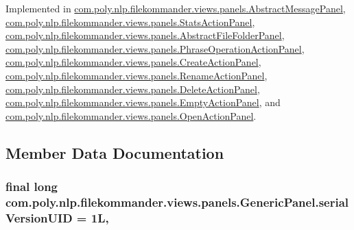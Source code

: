 Implemented in \hyperlink{classcom_1_1poly_1_1nlp_1_1filekommander_1_1views_1_1panels_1_1_abstract_message_panel_a305ad7e0b41448b92cfc567062fbb874}{com.\-poly.\-nlp.\-filekommander.\-views.\-panels.\-Abstract\-Message\-Panel}, \hyperlink{classcom_1_1poly_1_1nlp_1_1filekommander_1_1views_1_1panels_1_1_stats_action_panel_a2c9b149207152e5d1570c62172fd8823}{com.\-poly.\-nlp.\-filekommander.\-views.\-panels.\-Stats\-Action\-Panel}, \hyperlink{classcom_1_1poly_1_1nlp_1_1filekommander_1_1views_1_1panels_1_1_abstract_file_folder_panel_a2308ee0dc3eaea5b8b525fd02f60e000}{com.\-poly.\-nlp.\-filekommander.\-views.\-panels.\-Abstract\-File\-Folder\-Panel}, \hyperlink{classcom_1_1poly_1_1nlp_1_1filekommander_1_1views_1_1panels_1_1_phrase_operation_action_panel_a602dc045881eb866cc9bebbb5b925a00}{com.\-poly.\-nlp.\-filekommander.\-views.\-panels.\-Phrase\-Operation\-Action\-Panel}, \hyperlink{classcom_1_1poly_1_1nlp_1_1filekommander_1_1views_1_1panels_1_1_create_action_panel_a94e3d36d8b58ed6cabfc7f4e62ca7f4d}{com.\-poly.\-nlp.\-filekommander.\-views.\-panels.\-Create\-Action\-Panel}, \hyperlink{classcom_1_1poly_1_1nlp_1_1filekommander_1_1views_1_1panels_1_1_rename_action_panel_a9defdeb4b3f825b7bd34081700b92e10}{com.\-poly.\-nlp.\-filekommander.\-views.\-panels.\-Rename\-Action\-Panel}, \hyperlink{classcom_1_1poly_1_1nlp_1_1filekommander_1_1views_1_1panels_1_1_delete_action_panel_a8334eff673455509d9432646a4c49799}{com.\-poly.\-nlp.\-filekommander.\-views.\-panels.\-Delete\-Action\-Panel}, \hyperlink{classcom_1_1poly_1_1nlp_1_1filekommander_1_1views_1_1panels_1_1_empty_action_panel_a3e1704fd567bd8b67851f6068035aad3}{com.\-poly.\-nlp.\-filekommander.\-views.\-panels.\-Empty\-Action\-Panel}, and \hyperlink{classcom_1_1poly_1_1nlp_1_1filekommander_1_1views_1_1panels_1_1_open_action_panel_aa37ab18925690ab2ed3ba3f1071126b2}{com.\-poly.\-nlp.\-filekommander.\-views.\-panels.\-Open\-Action\-Panel}.



\subsection{Member Data Documentation}
\hypertarget{classcom_1_1poly_1_1nlp_1_1filekommander_1_1views_1_1panels_1_1_generic_panel_ac3f7f05bbdfeb29c6d8dd1eebfbda726}{
\subsubsection[{serial\-Version\-U\-I\-D}]{\setlength{\rightskip}{0pt plus 5cm}final long com.\-poly.\-nlp.\-filekommander.\-views.\-panels.\-Generic\-Panel.\-serial\-Version\-U\-I\-D = 1\-L\hspace{0.3cm}{\ttfamily [static]}, {\ttfamily [private]}}}\label{classcom_1_1poly_1_1nlp_1_1filekommander_1_1views_1_1panels_1_1_generic_panel_ac3f7f05bbdfeb29c6d8dd1eebfbda726}


